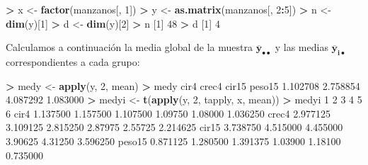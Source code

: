 \documentclass[
  a4paper,
  oneside]{scrbook}
\newenvironment{Shaded}{\begin{snugshade}}{\end{snugshade}}
\newcommand{\DecValTok}[1]{\textcolor[rgb]{0.00,0.00,0.81}{#1}}
\newcommand{\FloatTok}[1]{\textcolor[rgb]{0.00,0.00,0.81}{#1}}
\newcommand{\FunctionTok}[1]{\textcolor[rgb]{0.13,0.29,0.53}{\textbf{#1}}}
\newcommand{\NormalTok}[1]{#1}
\newcommand{\OtherTok}[1]{\textcolor[rgb]{0.56,0.35,0.01}{#1}}
\newcommand{\SpecialCharTok}[1]{\textcolor[rgb]{0.81,0.36,0.00}{\textbf{#1}}}
\theoremstyle{definition}
\theoremstyle{definition}
\theoremstyle{definition}
\theoremstyle{definition}
\theoremstyle{remark}
\begin{document}
\footnotesize

\begin{Shaded}
\begin{Highlighting}[]
\SpecialCharTok{\textgreater{}}\NormalTok{ x }\OtherTok{\textless{}{-}} \FunctionTok{factor}\NormalTok{(manzanos[, }\DecValTok{1}\NormalTok{])}
\SpecialCharTok{\textgreater{}}\NormalTok{ y }\OtherTok{\textless{}{-}} \FunctionTok{as.matrix}\NormalTok{(manzanos[, }\DecValTok{2}\SpecialCharTok{:}\DecValTok{5}\NormalTok{])}
\SpecialCharTok{\textgreater{}}\NormalTok{ n }\OtherTok{\textless{}{-}} \FunctionTok{dim}\NormalTok{(y)[}\DecValTok{1}\NormalTok{]}
\SpecialCharTok{\textgreater{}}\NormalTok{ d }\OtherTok{\textless{}{-}} \FunctionTok{dim}\NormalTok{(y)[}\DecValTok{2}\NormalTok{]}
\SpecialCharTok{\textgreater{}}\NormalTok{ n}
\NormalTok{[}\DecValTok{1}\NormalTok{] }\DecValTok{48}
\SpecialCharTok{\textgreater{}}\NormalTok{ d}
\NormalTok{[}\DecValTok{1}\NormalTok{] }\DecValTok{4}
\end{Highlighting}
\end{Shaded}

\normalsize

Calculamos a continuación la media global de la muestra
\(\bm{\overline{y}_{\bullet\bullet}}\) y las medias
\(\bm{\overline{y}_{i\bullet}}\) correspondientes a cada grupo:

\footnotesize

\begin{Shaded}
\begin{Highlighting}[]
\SpecialCharTok{\textgreater{}}\NormalTok{ medy }\OtherTok{\textless{}{-}} \FunctionTok{apply}\NormalTok{(y, }\DecValTok{2}\NormalTok{, mean)}
\SpecialCharTok{\textgreater{}}\NormalTok{ medy}
\NormalTok{    cir4    crec4    cir15   peso15 }
\FloatTok{1.102708} \FloatTok{2.758854} \FloatTok{4.087292} \FloatTok{1.083000} 
\SpecialCharTok{\textgreater{}}\NormalTok{ medyi }\OtherTok{\textless{}{-}} \FunctionTok{t}\NormalTok{(}\FunctionTok{apply}\NormalTok{(y, }\DecValTok{2}\NormalTok{, tapply, x, mean))}
\SpecialCharTok{\textgreater{}}\NormalTok{ medyi}
              \DecValTok{1}        \DecValTok{2}        \DecValTok{3}       \DecValTok{4}       \DecValTok{5}        \DecValTok{6}
\NormalTok{cir4   }\FloatTok{1.137500} \FloatTok{1.157500} \FloatTok{1.107500} \FloatTok{1.09750} \FloatTok{1.08000} \FloatTok{1.036250}
\NormalTok{crec4  }\FloatTok{2.977125} \FloatTok{3.109125} \FloatTok{2.815250} \FloatTok{2.87975} \FloatTok{2.55725} \FloatTok{2.214625}
\NormalTok{cir15  }\FloatTok{3.738750} \FloatTok{4.515000} \FloatTok{4.455000} \FloatTok{3.90625} \FloatTok{4.31250} \FloatTok{3.596250}
\NormalTok{peso15 }\FloatTok{0.871125} \FloatTok{1.280500} \FloatTok{1.391375} \FloatTok{1.03900} \FloatTok{1.18100} \FloatTok{0.735000}
\end{Highlighting}
\end{Shaded}
\end{document}
